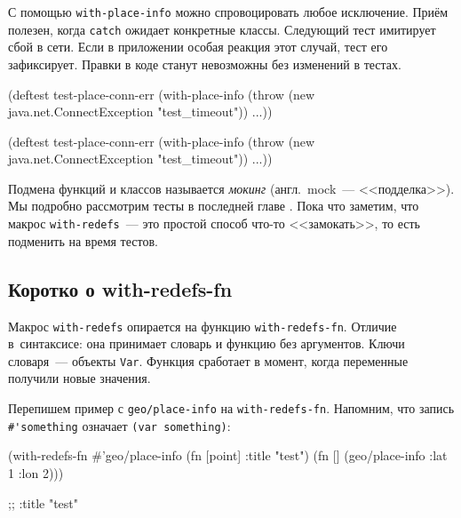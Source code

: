 \fi

С помощью \verb|with-place-info| можно спровоцировать любое исключение. Приём
полезен, когда \verb|catch| ожидает конкретные классы. Следующий тест имитирует
сбой в сети. Если в приложении особая реакция этот случай, тест его
зафиксирует. Правки в коде станут невозможны без изменений в тестах.


\ifnarrow

\begin{english}
  \begin{clojure}
(deftest test-place-conn-err
  (with-place-info
    (throw (new java.net.ConnectException
             "test_timeout"))
    ...))
  \end{clojure}
\end{english}

\else

\begin{english}
  \begin{clojure}
(deftest test-place-conn-err
  (with-place-info
    (throw (new java.net.ConnectException "test_timeout"))
    ...))
  \end{clojure}
\end{english}

\fi


Подмена функций и классов называется \emph{мокинг} (англ.~mock~--- <<подделка>>). Мы
подробно рассмотрим тесты в последней главе . Пока что
заметим, что макрос \verb|with-redefs|~--- это простой способ что-то <<замокать>>,
то есть подменить на время тестов.

\subsection{Коротко о with-redefs-fn}


Макрос \verb|with-redefs| опирается на функцию \verb|with-redefs-fn|. Отличие
в~синтаксисе: она принимает словарь и функцию без аргументов. Ключи словаря~---
объекты \verb|Var|. Функция сработает в момент, когда переменные получили новые
значения.

Перепишем пример с \verb|geo/place-info| на \texttt{with\--re\-defs\--fn}. Напомним, что
запись \verb|#'|\texttt{some\-thing} означает \verb|(var something)|:

\ifnarrow

\begin{english}
  \begin{clojure}
(with-redefs-fn
  {#'geo/place-info (fn [point]
                      {:title "test"})}
  (fn []
    (geo/place-info {:lat 1 :lon 2})))

;; {:title "test"}
  \end{clojure}
\end{english}

